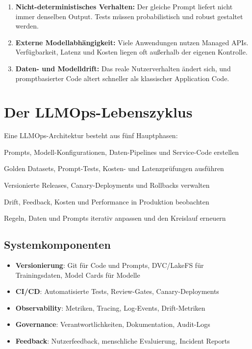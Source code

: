 \begin{enumerate}[leftmargin=*]
    \item \textbf{Nicht-deterministisches Verhalten:} Der gleiche Prompt liefert nicht immer denselben Output. Tests müssen probabilistisch und robust gestaltet werden.
    \item \textbf{Externe Modellabhängigkeit:} Viele Anwendungen nutzen Managed APIs. Verfügbarkeit, Latenz und Kosten liegen oft außerhalb der eigenen Kontrolle.
    \item \textbf{Daten- und Modelldrift:} Das reale Nutzerverhalten ändert sich, und promptbasierter Code altert schneller als klassischer Application Code.
\end{enumerate}

\section{Der LLMOps-Lebenszyklus}

Eine LLMOps-Architektur besteht aus fünf Hauptphasen:

\begin{description}[leftmargin=*,style=nextline]
    \item[Entwickeln] Prompts, Modell-Konfigurationen, Daten-Pipelines und Service-Code erstellen
    \item[Testen] Golden Datasets, Prompt-Tests, Kosten- und Latenzprüfungen ausführen
    \item[Ausrollen] Versionierte Releases, Canary-Deployments und Rollbacks verwalten
    \item[Überwachen] Drift, Feedback, Kosten und Performance in Produktion beobachten
    \item[Verbessern] Regeln, Daten und Prompts iterativ anpassen und den Kreislauf erneuern
\end{description}

\subsection{Systemkomponenten}

\begin{itemize}[leftmargin=*]
    \item \textbf{Versionierung}: Git für Code und Prompts, DVC/LakeFS für Trainingsdaten, Model Cards für Modelle
    \item \textbf{CI/CD}: Automatisierte Tests, Review-Gates, Canary-Deployments
    \item \textbf{Observability}: Metriken, Tracing, Log-Events, Drift-Metriken
    \item \textbf{Governance}: Verantwortlichkeiten, Dokumentation, Audit-Logs
    \item \textbf{Feedback}: Nutzerfeedback, menschliche Evaluierung, Incident Reports
\end{itemize}

